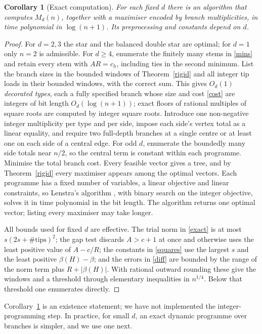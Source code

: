 \documentclass[11pt,a4paper]{article}
\newtheorem{corollary}[theorem]{Corollary}
\theoremstyle{remark}
\begin{document}
\begin{corollary}[Exact computation]\label{algo}
For each fixed $d$ there is an algorithm that computes $M_d(n)$, together with a maximiser encoded by branch multiplicities, in time polynomial in $\log(n+1)$. Its preprocessing and constants depend on $d$.
\end{corollary}
\begin{proof}
For $d=2,3$ the star and the balanced double star are optimal; for $d=1$ only $n=2$ is admissible. For $d\ge4$, enumerate the finitely many stems in \eqref{mins} and retain every stem with $AR=c_h$, including ties in the second minimum. List the branch sizes in the bounded windows of Theorem~\ref{rigid} and all integer tip loads in their bounded windows, with the correct sum. This gives $O_d(1)$ \emph{decorated types}, each a fully specified branch whose size and cost \eqref{cost} are integers of bit length $O_d(\log(n+1))$; exact floors of rational multiples of square roots are computed by integer square roots. Introduce one non-negative integer multiplicity per type and per side, impose each side's vertex total as a linear equality, and require two full-depth branches at a single centre or at least one on each side of a central edge. For odd $d$, enumerate the boundedly many side totals near $n/2$, so the central term is constant within each programme. Minimise the total branch cost. Every feasible vector gives a tree, and by Theorem~\ref{rigid} every maximiser appears among the optimal vectors. Each programme has a fixed number of variables, a linear objective and linear constraints, so Lenstra's algorithm \cite{lenstra}, with binary search on the integer objective, solves it in time polynomial in the bit length. The algorithm returns one optimal vector; listing every maximiser may take longer.

All bounds used for fixed $d$ are effective. The trial norm in \eqref{exact} is at most $s(2s+\#\text{tips})^2$; the gap test discards $A>c+1$ at once and otherwise uses the least positive value of $A-c/R$; the constants in \eqref{squares} use the largest $s$ and the least positive $\beta(H)-\beta$; and the errors in \eqref{diff} are bounded by the range of the norm term plus $R+|\beta(H)|$. With rational outward rounding these give the windows and a threshold through elementary inequalities in $n^{1/4}$. Below that threshold one enumerates directly.
\end{proof}

Corollary~\ref{algo} is an existence statement; we have not implemented the integer-programming step. In practice, for small $d$, an exact dynamic programme over branches is simpler, and we use one next.
\end{document}
